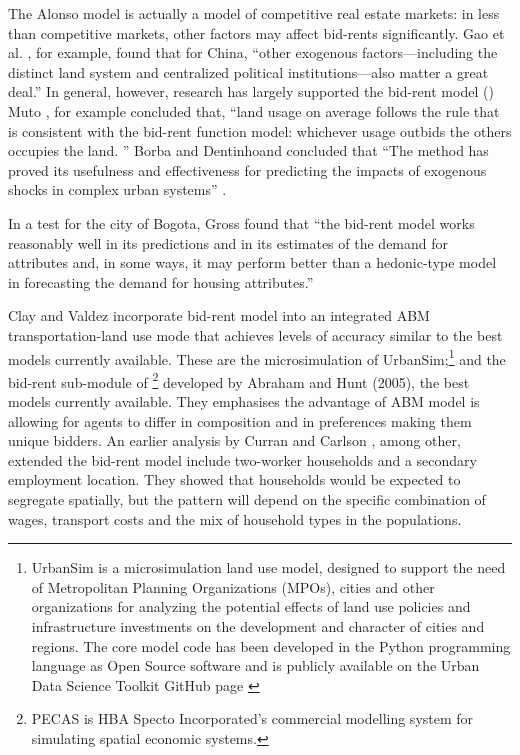 The Alonso model is actually a model of competitive real estate markets: in less than competitive markets, other factors may affect bid-rents significantly. %
Gao et al. \cite{GaoJinlong2020BtbT}, for example,  found  that for China, ``other exogenous  factors---including the distinct land system  and centralized political institutions---also matter a great deal.'' In general, however, 
research has largely supported the bid-rent model (\cite{mutoEstimationBidRent2006, wheatonBidRentApproach1977}) Muto \cite{mutoEstimationBidRent2006}, for example concluded that,  ``land usage on average follows the rule that is consistent with the bid-rent function model: whichever usage outbids the others occupies the land. ''  Borba and Dentinhoand concluded that ``The method has proved its usefulness and effectiveness for predicting the impacts of exogenous shocks in complex urban systems'' \cite{borbaEvaluationUrbanScenarios2016}.  

In a test for the city of Bogota, Gross \cite{grossEstimatingWillingnessPay1988} found that ``the bid-rent model works reasonably well in its predictions and in its estimates of the demand for attributes and, in some ways, it may perform better than a hedonic-type model in forecasting the demand for housing attributes.'' 

Clay and Valdez incorporate bid-rent model into an integrated ABM transportation-land use mode that achieves levels of accuracy similar to the best models currently available. These are the microsimulation of UrbanSim;\footnote{UrbanSim is a microsimulation land use model, designed to support the need of Metropolitan Planning Organizations (MPOs), cities and other organizations for analyzing the potential effects of land use policies and infrastructure investments on the development and character of cities and regions. The core model code has been developed in the Python programming language as Open Source software and is publicly available on the Urban Data Science Toolkit GitHub page \cite{waddellmodellinurbandev2002}} and the bid-rent sub-module of \footnote{PECAS is  HBA Specto Incorporated's commercial modelling system  for simulating spatial economic systems.} developed by Abraham and Hunt (2005), the best models currently available. They emphasises the advantage of ABM model is allowing for agents to differ in composition and in preferences making them unique bidders. 
An earlier analysis by Curran and Carlson \cite{curranTheoryResidentialLocation1982}, among other, extended the bid-rent model include two-worker households and a secondary employment location. They showed that households would be expected to segregate spatially, but the pattern will depend on the specific combination of wages, transport costs and the mix of household types in the populations. 

